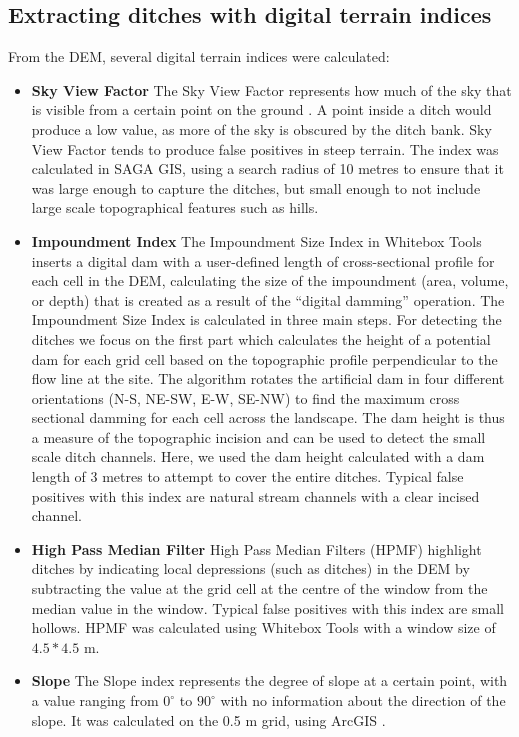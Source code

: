 \documentclass[11pt, review]{elsarticle} %
\begin{document}
\subsection{Extracting ditches with digital terrain indices}
From the DEM, several digital terrain indices were calculated:
\begin{itemize} \label{data_attributes}

  \item \textbf{Sky View Factor} \label{skyviewfactor} \newline
    The Sky View Factor represents how much of the sky that is visible from a certain point on the ground \citep{zaksek}. A point inside a ditch would produce a low value, as more of the sky is obscured by the ditch bank. Sky View Factor tends to produce false positives in steep terrain. The index was calculated in SAGA GIS, using a search radius of 10 metres to ensure that it was large enough to capture the ditches, but small enough to not include large scale topographical features such as hills.

  \item \textbf{Impoundment Index} \label{impoundment} \newline
    The Impoundment Size Index in Whitebox Tools \citep{whiteboxtools} inserts a digital dam with a user-defined length of cross-sectional profile for each cell in the DEM, calculating the size of the impoundment (area, volume, or depth) that is created as a result of the “digital damming” operation. The Impoundment Size Index is calculated in three main steps. For detecting the ditches we focus on the first part which calculates the height of a potential dam for each grid cell based on the topographic profile perpendicular to the flow line at the site. The algorithm rotates the artificial dam in four different orientations (N-S, NE-SW, E-W, SE-NW) to find the maximum cross sectional damming for each cell across the landscape. The dam height is thus a measure of the topographic incision and can be used to detect the small scale ditch channels. Here, we used the dam height calculated with a dam length of 3 metres to attempt to cover the entire ditches. Typical false positives with this index are natural stream channels with a clear incised channel.
  
  \item \textbf{High Pass Median Filter} \label{hpmf} \newline
    High Pass Median Filters (HPMF) highlight ditches by indicating local depressions (such as ditches) in the DEM by subtracting the value at the grid cell at the centre of the window from the median value in the window. Typical false positives with this index are small hollows. HPMF was calculated using Whitebox Tools \citep{whiteboxtools} with a window size of $4.5 * 4.5$ m. 

    \item \textbf{Slope} \label{slope} \newline
    The Slope index represents the degree of slope at a certain point, with a value ranging from $0^{\circ}$ to $90^{\circ}$ with no information about the direction of the slope. It was calculated on the 0.5 m grid, using ArcGIS \citep{EsriArcGisBook}.
\end{itemize}
\end{document}

